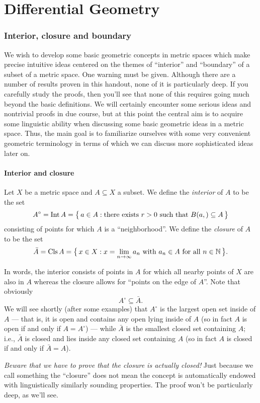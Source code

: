\chapter{Differential Geometry}
\subsection{Interior, closure and boundary}
We wish to develop some basic geometric concepts in metric spaces which
make precise intuitive ideas centered on the themes of ``interior'' and
``boundary'' of a subset of a metric space. One warning must be
given. Although there are a number of results proven in this handout, none
of it is particularly deep. If you carefully study the proofs, then you'll
see that none of this requires going much beyond the basic definitions. We
will certainly encounter some serious ideas and nontrivial proofs in due
course, but at this point the central aim is to acquire some linguistic
ability when discussing some basic geometric ideas in a metric space. Thus,
the main goal is to familiarize ourselves with some very convenient
geometric terminology in terms of which we can discuss more sophisticated
ideas later on.
\subsubsection{Interior and closure}
Let \(X\) be a metric space and \(A\subseteq X\) a subset. We define the
\emph{interior} of \(A\) to be the set
\[
  A^\circ=\operatorname{Int} A=\bigl\{\,a\in A:\text{there exists \(r>0\) such that
    \(B(a,)\subseteq A\)}\,\bigr\}
\]
consisting of points for which \(A\) is a ``neighborhood''. We define the
\emph{closure}  of \(A\) to be the set
\[
  \bar A=\operatorname{Cls} A=\bigl\{\,x\in X:\text{\(x=\lim_{n\to\infty} a_n\) with
    \(a_n\in A\) for all \(n\in\mathbb{N}\)}\,\bigr\}.
\]

In words, the interior consists of points in \(A\) for which all nearby
points of \(X\) are also in \(A\) whereas the closure allows for ``points
on the edge of \(A\)''. Note that obviously
\[
  A^\circ\subseteq\bar A.
\]
We will see shortly (after some examples) that \(A^\circ\) is the largest
open set inside of \(A\) --- that is, it is open and contains any open
lying inside of \(A\) (so in fact \(A\) is open if and only if
\(A=A^\circ\)) --- while \(\bar A\) is the smallest closed set containing
\(A\); i.e., \(\bar A\) is closed and lies inside any closed set containing
\(A\) (so  in fact \(A\) is closed if and only if \(\bar A=A\)).

\emph{Beware that we have to prove that the closure is actually closed!}
Just because we call  something the ``closure'' does not mean the concept
is automatically endowed with linguistically similarly sounding
properties. The proof won't be particularly deep, as we'll see.

